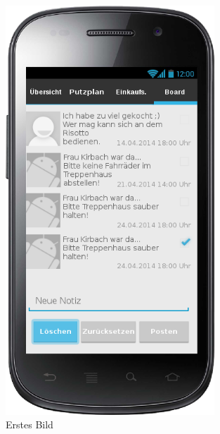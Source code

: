 \begin{figure}[htbp] 
  \centering
     \includegraphics[width=0.7\textwidth]{anhang/mockups/blackboardnotizloeschen.png}
  \caption{Erstes Bild}
  \label{fig:Bild1}
\end{figure}

